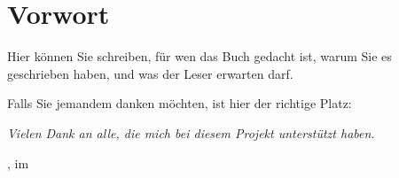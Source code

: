 
\chapter*{Vorwort}

Hier können Sie schreiben, für wen das Buch gedacht ist,
warum Sie es geschrieben haben, und was der Leser erwarten darf.

\bigskip

Falls Sie jemandem danken möchten, ist hier der richtige Platz:

\bigskip

{\itshape
	Vielen Dank an alle, die mich bei diesem Projekt unterstützt haben.}

\vfill

\myLocation, im \myYear

\myName

\vspace{2cm}

